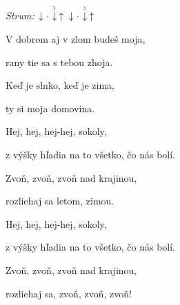 \begin{song}


\begin{strumbox}
\textit{Strum:} $\Down\Miss\AccentDown\Up\ \Down\Miss\AccentDown\Up$
\end{strumbox}

\begin{chordbox}
\vspace{2em}
 \par
{} \par
{} \par
{} \par
{} \par
{} \par
{} \par
\end{chordbox}

\bigskip

 \par
{} V dobrom aj v zlom budeš moja, \par
{} rany tie sa s tebou zhoja. \par
{}Keď je slnko, keď je zima, \par
{}ty si moja domovina. \par

\bigskip

\begin{chorusbox}{\Refren}
Hej, hej, hej-hej, sokoly, \par
{}z výšky hľadia na to všetko, čo nás bolí. \par
{}Zvoň, zvoň, zvoň nad krajinou, \par
{}rozliehaj sa letom, zimou. \par

\bigskip

Hej, hej, hej-hej, sokoly, \par
{}z výšky hľadia na to všetko, čo nás bolí. \par
{}Zvoň, zvoň, zvoň nad krajinou, \par
{}rozliehaj sa, zvoň, zvoň, zvoň! \par
\end{chorusbox}


\end{song}
